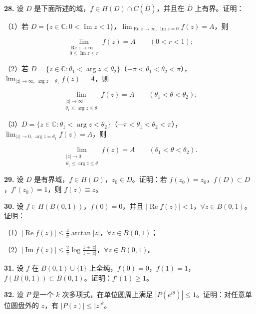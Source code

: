 \documentclass[11pt,a4paper]{article}
\begin{document}
\par{}
\noindent\textbf{28.} 设 \(D\)
是下面所述的域，\(f\in H(D)\cap C(\overline D)\)，并且在 \(\overline D\)
上有界。证明：

（1）若
\(D=\{z\in\mathbb C:0<\operatorname{Im}z<1\}\)，\(\lim_{\operatorname{Re}z\to\infty,\ \operatorname{Im}z=0}f(z)=A\)，则

\[
\lim_{\substack{\operatorname{Re}z\to\infty\\0\le\operatorname{Im}z\le r}}f(z)=A
\qquad(0<r<1);
\]

（2）若
\(D=\{z\in\mathbb C:\theta_1<\arg z<\theta_2\}\)（\(-\pi<\theta_1<\theta_2<\pi\)），\(\lim_{|z|\to\infty,\ \arg z=\theta_1}f(z)=A\)，则

\[
\lim_{\substack{|z|\to\infty\\\theta_1\le\arg z\le\theta}}f(z)=A
\qquad(\theta_1<\theta<\theta_2);
\]

（3）\(D=\{z\in\mathbb C:\theta_1<\arg z<\theta_2\}\)（\(-\pi<\theta_1<\theta_2<\pi\)），\(\lim_{|z|\to0,\ \arg z=\theta_1}f(z)=A\)，则

\[
\lim_{\substack{|z|\to0\\\theta_1\le\arg z\le\theta}}f(z)=A
\qquad(\theta_1<\theta<\theta_2).
\]

\par{}
\noindent\textbf{29.} 设 \(D\) 是有界域，\(f\in H(D)\)，\(z_0\in D\)。证明：若
\(f(z_0)=z_0\)，\(f(D)\subset D\)，\(f'(z_0)=1\)，则 \(f(z)\equiv z\)。

\par{}
\noindent\textbf{30.} 设 \(f\in H(B(0,1))\)，\(f(0)=0\)，并且
\(|\operatorname{Re}f(z)|<1\)，\(\forall z\in B(0,1)\)。证明：

（1）\(\displaystyle|\operatorname{Re}f(z)|\le\frac4\pi\arctan|z|\)，\(\forall z\in B(0,1)\)；

（2）\(\displaystyle|\operatorname{Im}f(z)|\le\frac2\pi\log\frac{1+|z|}{1-|z|}\)，\(\forall z\in B(0,1)\)。

\par{}
\noindent\textbf{31.} 设 \(f\) 在 \(B(0,1)\cup\{1\}\)
上全纯，\(f(0)=0\)，\(f(1)=1\)，\(f(B(0,1))\subset B(0,1)\)。证明：\(f'(1)\ge1\)。

\par{}
\noindent\textbf{32.} 设 \(P\) 是一个 \(k\) 次多项式，在单位圆周上满足
\(|P(e^{i\theta})|\le1\)。证明：对任意单位圆盘外的 \(z\)，有
\(|P(z)|\le|z|^k\)。
\end{document}
